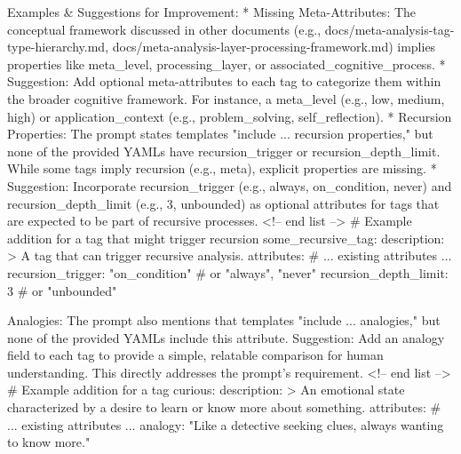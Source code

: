 {Examples & Suggestions for Improvement:
 * Missing Meta-Attributes: The conceptual framework discussed in other documents (e.g., docs/meta-analysis-tag-type-hierarchy.md, docs/meta-analysis-layer-processing-framework.md) implies properties like meta_level, processing_layer, or associated_cognitive_process.
   * Suggestion: Add optional meta-attributes to each tag to categorize them within the broader cognitive framework. For instance, a meta_level (e.g., low, medium, high) or application_context (e.g., problem_solving, self_reflection).
 * Recursion Properties: The prompt states templates "include ... recursion properties," but none of the provided YAMLs have recursion_trigger or recursion_depth_limit. While some tags imply recursion (e.g., meta), explicit properties are missing.
   * Suggestion: Incorporate recursion_trigger (e.g., always, on_condition, never) and recursion_depth_limit (e.g., 3, unbounded) as optional attributes for tags that are expected to be part of recursive processes.
     <!-- end list -->
   # Example addition for a tag that might trigger recursion
some_recursive_tag:
  description: >
    A tag that can trigger recursive analysis.
  attributes:
    # ... existing attributes ...
    recursion_trigger: "on_condition" # or "always", "never"
    recursion_depth_limit: 3 # or "unbounded"

Analogies: The prompt also mentions that templates "include ... analogies," but none of the provided YAMLs include this attribute.
Suggestion: Add an analogy field to each tag to provide a simple, relatable comparison for human understanding. This directly addresses the prompt's requirement. <!-- end list --> # Example addition for a tag curious: description: > An emotional state characterized by a desire to learn or know more about something. attributes: # ... existing attributes ... analogy: "Like a detective seeking clues, always wanting to know more."

}

